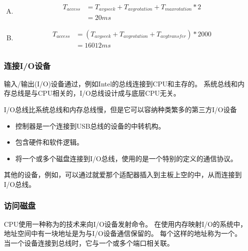 {{{\begin{practicec}
                \begin{enumerate}[A.]
                    \item
                    {
                        \begin{align*}
                            T_{access} &= T_{avg seek} + T_{avg rotation}+ T_{max rotation} * 2 \\
                            &= 20ms
                        \end{align*}
                    }
                    \item
                    {
                        \begin{align*}
                            T_{access} &= (T_{avg seek} + T_{avg rotation} + T_{avg transfer}) * 2000 \\
                            &= 16012ms
                        \end{align*}
                    }
                \end{enumerate}
            \end{practicec}
        }

        \subsubsection{连接I/O设备}
        {
            输入/输出(I/O)设备通过，例如Intel的总线连接到CPU和主存的。
            系统总线和内存总线是与CPU相关的，I/O总线设计成与底层CPU无关。

            I/O总线比系统总线和内存总线慢，但是它可以容纳种类繁多的第三方I/O设备

            \begin{itemize}
                \item {}控制器是一个连接到USB总线的设备的中转机构。
                \item {}包含硬件和软件逻辑。
                \item {}将一个或多个磁盘连接到I/O总线，使用的是一个特别的定义的通信协议。
            \end{itemize}

            其他的设备，例如，可以通过就爱那个适配器插入到主板上空的中，从而连接到I/O总线。
        }

        \subsubsection{访问磁盘}
        {
            CPU使用一种称为的技术来向I/O设备发射命令。
            在使用内存映射I/O的系统中，地址空间中有一块地址是为与I/O设备通信保留的。
            每个这样的地址称为一个。
            当一个设备连接到总线时，它与一个或多个端口相关联。

}}}
